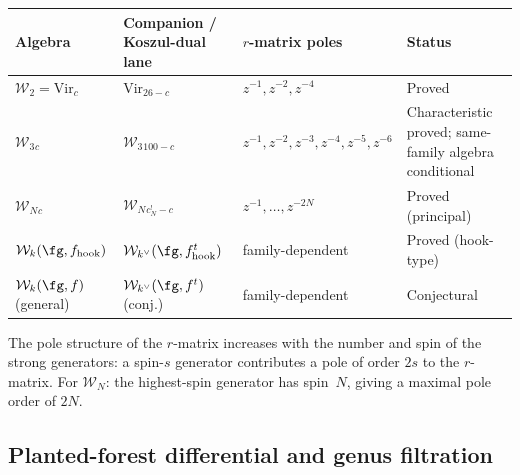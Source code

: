 \begin{computation}
\begin{center}
\renewcommand{\arraystretch}{1.4}
\begin{tabular}{llll}
\textbf{Algebra} & \textbf{Companion / Koszul-dual lane}
 & \textbf{$r$-matrix poles}
 & \textbf{Status} \\
\hline
$\mathcal{W}_2=\mathrm{Vir}_c$
 & $\mathrm{Vir}_{26-c}$
 & $z^{-1},z^{-2},z^{-4}$
 & Proved \\[3pt]
$\mathcal{W}_3{}_c$
 & $\mathcal{W}_3{}_{100-c}$
 & $z^{-1},z^{-2},z^{-3},z^{-4},z^{-5},z^{-6}$
 & Characteristic proved; same-family algebra conditional \\[3pt]
$\mathcal{W}_N{}_c$
 & $\mathcal{W}_N{}_{c^!_N-c}$
 & $z^{-1},\ldots,z^{-2N}$
 & Proved (principal) \\[3pt]
$\mathcal{W}_k(\fg,f_{\mathrm{hook}})$
 & $\mathcal{W}_{k^\vee}(\fg,f_{\mathrm{hook}}^t)$
 & family-dependent
 & Proved (hook-type) \\[3pt]
$\mathcal{W}_k(\fg,f)$ (general)
 & $\mathcal{W}_{k^\vee}(\fg,f^t)$ (conj.)
 & family-dependent
 & Conjectural
\end{tabular}
\end{center}
The pole structure of the $r$-matrix increases with the
number and spin of the strong generators: a spin-$s$
generator contributes a pole of order $2s$ to the
$r$-matrix. For $\mathcal{W}_N$: the highest-spin
generator has spin~$N$, giving a maximal pole order
of $2N$.
\end{computation}

\subsection{Planted-forest differential and genus filtration}

